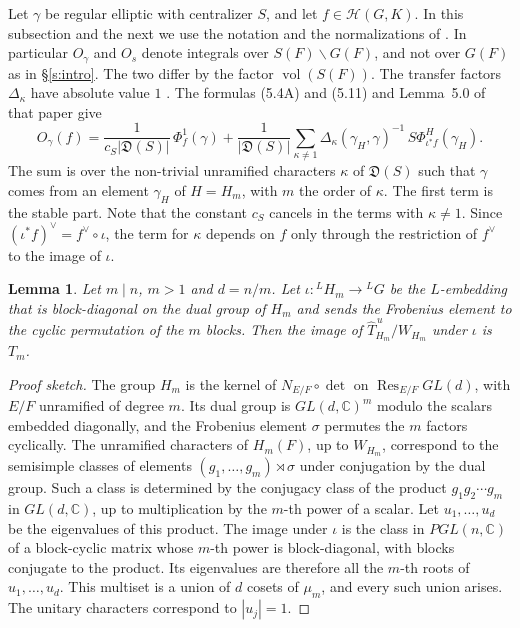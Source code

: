 \documentclass[12pt,letterpaper]{article}
\numberwithin{equation}{section}
\theoremstyle{plain}
\newtheorem{lemma}[theorem]{Lemma}
\theoremstyle{definition}
\theoremstyle{remark}
\newcommand{\Hc}{\mathcal{H}}
\newcommand{\Thu}{\widehat{T}^{\,u}}
\DeclareMathOperator{\vol}{vol}
\begin{document}
Let $\gamma$ be regular elliptic with centralizer $S$, and let $f\in\Hc(G,K)$. In this subsection and the next we use the notation and the normalizations of \cite[\S5]{JC26}. In particular $O_\gamma$ and $O_s$ denote integrals over $S(F)\backslash G(F)$, and not over $G(F)$ as in \S\ref{s:intro}. The two differ by the factor $\vol(S(F))$. The transfer factors $\Delta_\kappa$ have absolute value $1$ \cite[\S5.2]{JC26}. The formulas (5.4A) and (5.11) and Lemma~5.0 of that paper give
\begin{equation}\label{e:kappadecomp}
O_\gamma(f)=\frac{1}{c_S|\mathfrak D(S)|}\,\Phi^1_f(\gamma)+\frac{1}{|\mathfrak D(S)|}\sum_{\kappa\ne1}\Delta_\kappa(\gamma_H,\gamma)^{-1}\,S\Phi^{H}_{\iota^*f}(\gamma_H).
\end{equation}
The sum is over the non-trivial unramified characters $\kappa$ of $\mathfrak D(S)$ such that $\gamma$ comes from an element $\gamma_H$ of $H=H_m$, with $m$ the order of $\kappa$. The first term is the stable part. Note that the constant $c_S$ cancels in the terms with $\kappa\ne1$. Since $(\iota^*f)^\vee=f^\vee\circ\iota$, the term for $\kappa$ depends on $f$ only through the restriction of $f^\vee$ to the image of $\iota$.

\begin{lemma}\label{l:iota}
Let $m\mid n$, $m>1$ and $d=n/m$. Let $\iota:{}^LH_m\to{}^LG$ be the $L$-embedding that is block-diagonal on the dual group of $H_m$ and sends the Frobenius element to the cyclic permutation of the $m$ blocks. Then the image of $\Thu_{H_m}/W_{H_m}$ under $\iota$ is $T_m$.
\end{lemma}

\begin{proof}[Proof sketch]
The group $H_m$ is the kernel of $N_{E/F}\circ\det$ on $\operatorname{Res}_{E/F}GL(d)$, with $E/F$ unramified of degree $m$. Its dual group is $GL(d,\mathbb{C})^m$ modulo the scalars embedded diagonally, and the Frobenius element $\sigma$ permutes the $m$ factors cyclically. The unramified characters of $H_m(F)$, up to $W_{H_m}$, correspond to the semisimple classes of elements $(g_1,\dots,g_m)\rtimes\sigma$ under conjugation by the dual group. Such a class is determined by the conjugacy class of the product $g_1g_2\cdots g_m$ in $GL(d,\mathbb{C})$, up to multiplication by the $m$-th power of a scalar. Let $u_1,\dots,u_d$ be the eigenvalues of this product. The image under $\iota$ is the class in $PGL(n,\mathbb{C})$ of a block-cyclic matrix whose $m$-th power is block-diagonal, with blocks conjugate to the product. Its eigenvalues are therefore all the $m$-th roots of $u_1,\dots,u_d$. This multiset is a union of $d$ cosets of $\mu_m$, and every such union arises. The unitary characters correspond to $|u_j|=1$.
\end{proof}
\end{document}
